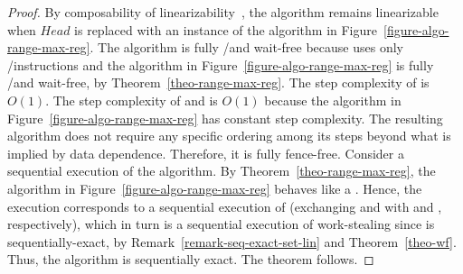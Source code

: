 \begin{proof}
By composability of linearizability~\cite{DBLP_journals_toplas_HerlihyW90}, the algorithm remains linearizable when \(Head\) is replaced with an instance of the algorithm in Figure~\ref{figure-algo-range-max-reg}.  The algorithm is fully \R/\W and wait-free because \Put uses only \R/\W instructions and the \RangeMaxReg algorithm in Figure~\ref{figure-algo-range-max-reg} is fully \R/\W and wait-free, by Theorem~\ref{theo-range-max-reg}.  The step complexity of \Put is $O(1)$.  The step complexity of \Take and \Steal is $O(1)$ because the \RangeMaxReg algorithm in Figure~\ref{figure-algo-range-max-reg} has constant step complexity.  The resulting algorithm does not require any specific ordering among its steps beyond what is implied by data dependence. Therefore, it is fully fence-free. Consider a sequential execution of the algorithm.  By Theorem~\ref{theo-range-max-reg}, the algorithm in Figure~\ref{figure-algo-range-max-reg} behaves like a \MaxReg. Hence, the execution corresponds to a sequential execution of \WFWSM (exchanging \RMaxR and \RMaxW with \MaxR and \MaxW, respectively), which in turn is a sequential execution of work-stealing since \WFWSM is sequentially-exact, by Remark~\ref{remark-seq-exact-set-lin} and Theorem~\ref{theo-wf}.  Thus, the algorithm is sequentially exact. The theorem follows.
\end{proof}

